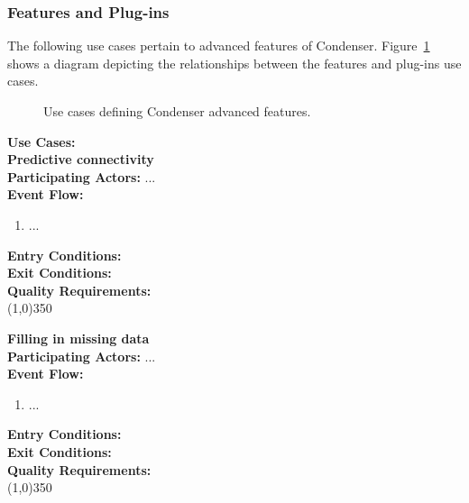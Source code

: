 \subsubsection{Features and Plug-ins}		
The following use cases pertain to advanced features of Condenser. Figure~\ref{FeaturesAndPluginsUse} shows a diagram depicting the relationships between the features and plug-ins use cases.
\begin{center}
	\begin{figure}[htbp]
		\caption{Use cases defining Condenser advanced features.\label{FeaturesAndPluginsUse}}
	\end{figure}
\end{center}	
\textbf{Use Cases:}\\

	\textbf{Predictive connectivity} \\	 
	\textbf{Participating Actors:}  ... \\
	\textbf{Event Flow:}
	\begin{enumerate}
\item  ...
    \end{enumerate}
	\textbf{Entry Conditions:}\\
	\textbf{Exit Conditions:}\\
	\textbf{Quality Requirements:}\\
	\line(1,0){350}		
 
	\textbf{Filling in missing data} \\	 
	\textbf{Participating Actors:}  ... \\
	\textbf{Event Flow:}
	\begin{enumerate}
\item  ...
    \end{enumerate}
	\textbf{Entry Conditions:}\\
	\textbf{Exit Conditions:}\\
	\textbf{Quality Requirements:}\\
	\line(1,0){350}		

